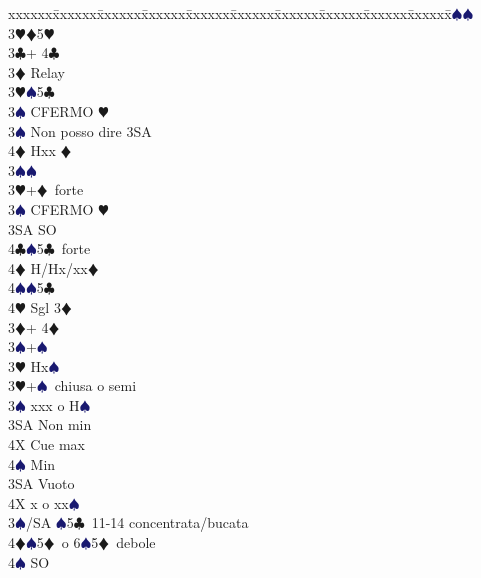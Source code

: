 \documentclass[a4paper,italian]{article}
\newcommand{\BC}{\textcolor{OliveGreen}{$\clubsuit$}}
\newcommand{\BD}{\textcolor{RedOrange}{$\vardiamondsuit$}}
\newcommand{\BH}{\textcolor{Red2}{$\varheartsuit${}}}
\newcommand{\BS}{\textcolor{MidnightBlue}{$\spadesuit${}}}
\newenvironment{bidtable}
{\begin{tabbing}

    xxxxxx\=xxxxxx\=xxxxxx\=xxxxxx\=xxxxxx\=xxxxxx\=xxxxxx\=xxxxxx\=xxxxxx\=xxxxxx\=\kill}
{\end{tabbing} }%
\begin{document}
\begin{multicols}{2}
\begin{bidtable}
        3\BS {}\BS \\
        3\BH {}\BD 5\BH\-\\
        3\BC {}+ 4\BC \+\\
        3\BD \> Relay\+\\
        3\BH {}\BS 5\BC \+\\
        3\BS \> CFERMO \BH\-\\
        3\BS \> Non posso dire 3SA\\
        4\BD \> Hxx \BD \-\\
        3\BS {}\BS \\
        3\BH {}+\BD\ forte\+\\
        3\BS\> CFERMO \BH\\
        3SA \> SO\\
        4\BC {}\BS 5\BC\ forte\\
        4\BD \> H/Hx/xx\BD \\
        4\BS {}\BS 5\BC \\
        4\BH \> Sgl 3\BD \-\-\\
        3\BD {}+ 4\BD \+\\
        3\BS {}+\BS \\
        3\BH \> Hx\BS \-\\
        3\BH {}+\BS\ chiusa o semi\+\\
        3\BS \> xxx o H\BS \+\\
        3SA \> Non min\\
        4X \> Cue max\\
        4\BS\> Min\-\\
        3SA \> Vuoto\\
        4X \> x o xx\BS \-\\
        3\BS/SA \BS 5\BC\ 11-14 concentrata/bucata\\
        4\BD {}\BS5\BD\ o 6\BS5\BD\ debole\+\\
        4\BS \> SO
    \end{bidtable}
\end{multicols}

\newpage
\end{document}
